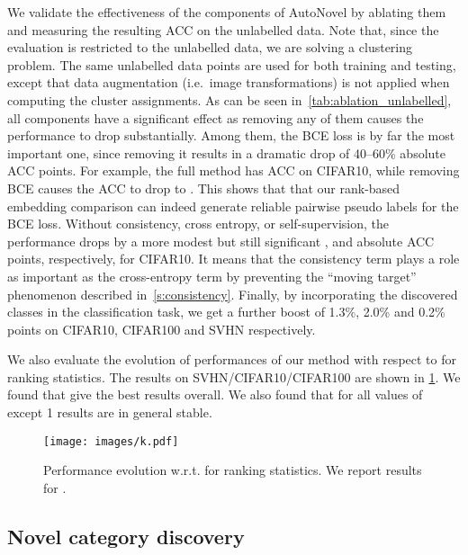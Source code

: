 We validate the effectiveness of the components of AutoNovel by ablating them and measuring the resulting ACC on the unlabelled data.
Note that, since the evaluation is restricted to the unlabelled data, we are solving a clustering problem. The same unlabelled data points are used for both training and testing, except that data augmentation (i.e.~image transformations) is not applied when computing the cluster assignments.
As can be seen in~\cref{tab:ablation_unlabelled}, all components have a significant effect as removing any of them causes the performance to drop substantially.
Among them, the BCE loss is by far the most important one, since removing it results in a dramatic drop of 40--60\% absolute ACC points.
For example, the full method has ACC  on CIFAR10, while removing BCE causes the ACC to drop to .
This shows that that our rank-based embedding comparison can indeed generate reliable pairwise pseudo labels for the BCE loss.
Without consistency, cross entropy, or self-supervision, the performance drops by a more modest but still significant ,  and  absolute ACC points, respectively, for CIFAR10.
It means that the consistency term plays a role as important as the cross-entropy term by preventing the ``moving target'' phenomenon described in~\cref{s:consistency}.
Finally, by incorporating the discovered classes in the classification task, we get a further boost of 1.3\%, 2.0\% and 0.2\% points on CIFAR10, CIFAR100 and SVHN respectively.

We also evaluate the evolution of performances of our method with respect to  for ranking statistics. The results on SVHN/CIFAR10/CIFAR100 are shown in \cref{fig:k}. We found that  give the best results overall. We also found that for all values of  except 1 results are in general stable.
\begin{figure}
    \centering
    \texttt{[image: images/k.pdf]}
    \caption{Performance evolution w.r.t.  for ranking statistics. We report results for .}
    \label{fig:k}
\end{figure}

\subsection{Novel category discovery}

